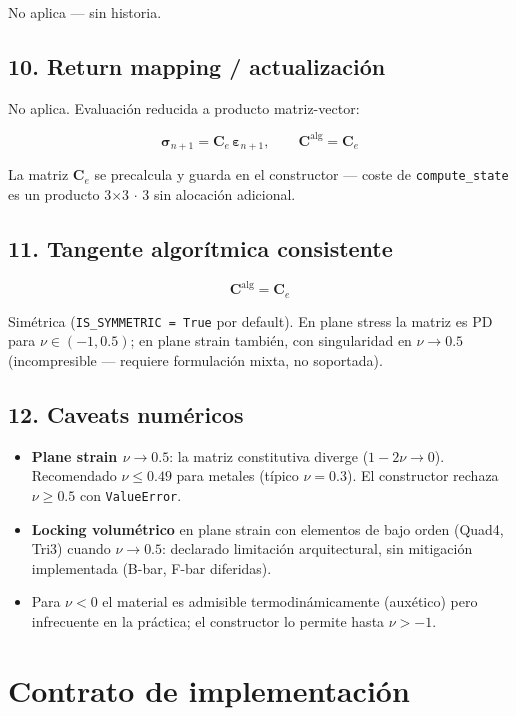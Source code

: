 \documentclass[11pt,letterpaper,oneside]{report}
\begin{document}
No aplica --- sin historia.

\subsection{10. Return mapping / actualización}

No aplica. Evaluación reducida a producto matriz-vector:

\[
\boldsymbol\sigma_{n+1} = \mathbf C_e\,\boldsymbol\varepsilon_{n+1}, \qquad \mathbf C^{\text{alg}} = \mathbf C_e
\]

La matriz $\mathbf C_e$ se precalcula y guarda en el constructor --- coste de \texttt{compute\_state} es un producto 3\ensuremath{\times}3 \ensuremath{\cdot} 3 sin alocación adicional.

\subsection{11. Tangente algorítmica consistente}

\[
\mathbf C^{\text{alg}} = \mathbf C_e
\]

Simétrica (\texttt{IS\_SYMMETRIC = True} por default). En plane stress la matriz es PD para $\nu \in (-1, 0.5)$; en plane strain también, con singularidad en $\nu \to 0.5$ (incompresible --- requiere formulación mixta, no soportada).

\subsection{12. Caveats numéricos}

\begin{itemize}
  \item \textbf{Plane strain $\nu \to 0.5$}: la matriz constitutiva diverge ($1-2\nu \to 0$). Recomendado $\nu \le 0.49$ para metales (típico $\nu=0.3$). El constructor rechaza $\nu \ge 0.5$ con \texttt{ValueError}.
  \item \textbf{Locking volumétrico} en plane strain con elementos de bajo orden (Quad4, Tri3) cuando $\nu \to 0.5$: declarado limitación arquitectural, sin mitigación implementada (B-bar, F-bar diferidas).
  \item Para $\nu < 0$ el material es admisible termodinámicamente (auxético) pero infrecuente en la práctica; el constructor lo permite hasta $\nu > -1$.
\end{itemize}


\section{Contrato de implementación}
\end{document}
